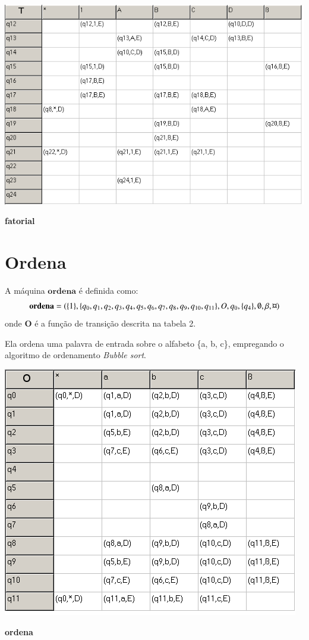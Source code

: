 \documentclass[a4paper]{article}
\begin{document}
\begin{table}[t!]
  \centering
  \includegraphics[scale=0.5]{fatorial_2.png}
  \caption{\textbf{fatorial}}
\end{table}

\section{Ordena}

A máquina $\mathbf{ordena}$ é definida como:
\begin{equation*}
\mathbf{ordena} = (\{1\}, \{q_0, q_1, q_2, q_3, q_4, q_5, q_6, q_7, q_8, q_9, q_{10}, q_{11}\}, O, q_0,
\{q_4\}, \emptyset, \beta, \text{\textcurrency} )\end{equation*} onde $\mathbf{O}$ é a função de transição descrita na tabela 2.

Ela ordena uma palavra de entrada sobre o alfabeto \{a, b, c\}, empregando o 
algoritmo de ordenamento \emph{Bubble sort}.

\begin{table}[b!]
  \centering
  \includegraphics[scale=0.5]{ordena.png}
  \caption{\textbf{ordena}}
\end{table}
\end{document}
